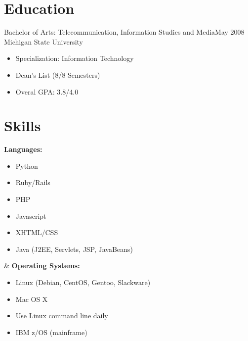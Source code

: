 \documentclass[11pt]{res}
\begin{document}
\begin{resume}
\section{Education}
Bachelor of Arts: Telecommunication, Information Studies and Media\dotfill May 2008\\
Michigan State University
\begin{itemize}
\item Specialization: Information Technology
\item Dean's List (8/8 Semesters)
\item Overal GPA: 3.8/4.0
\end{itemize}


\section{Skills}
\begin{ncolumn}{2}
  {\bf Languages:}
  \begin{itemize}
  \item Python
  \item Ruby/Rails
  \item PHP
  \item Javascript
  \item XHTML/CSS
  \item Java (J2EE, Servlets, JSP, JavaBeans)
  \end{itemize}
&
  {\bf Operating Systems:}
  \begin{itemize}
  \item Linux (Debian, CentOS, Gentoo, Slackware)
  \item Mac OS X
  \item Use Linux command line daily
  \item IBM z/OS (mainframe)
  \end{itemize}
\end{ncolumn}


\end{resume}
\end{document}
